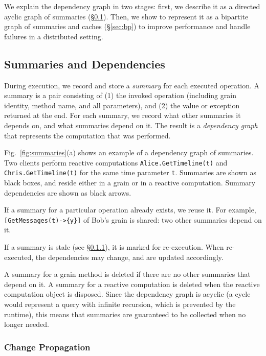 We explain the dependency graph in two stages: first, we describe it as a directed ayclic graph of summaries (\S\ref{sec:summaries}). Then, we show to represent it as a bipartite graph of summaries and caches (\S\ref{sec:bp}) to improve performance and handle failures in a distributed setting. 

\subsection{Summaries and Dependencies}\label{sec:summaries}

During execution, we record and store a \emph{summary} for each executed operation. A summary is a pair consisting of (1) the invoked operation (including grain identity, method name, and all parameters), and (2) the value or exception returned at the end. For each summary, we record what other summaries it depends on, and what summaries depend on it. The result is a \emph{dependency graph} that represents the computation that was performed.

Fig.~\ref{fig:summaries}(a) shows an example of a dependency graph of summaries. Two clients perform reactive computations \lstinline|Alice.GetTimeline(t)| and \lstinline|Chris.GetTimeline(t)| for the same time parameter \lstinline|t|. Summaries are shown as black boxes, and reside either in a grain or in a reactive computation. Summary dependencies are shown as black arrows.

 If a summary for a particular operation already exists, we reuse it. For example, \lstinline|[GetMessages(t)->{y}]| of Bob's grain is shared: two other summaries depend on it. 

 If a summary is stale (see \S\ref{sec:cp}), it is marked for re-execution. When re-executed, the dependencies may change, and are updated accordingly. 

 A summary for a grain method is deleted if there are no other summaries that depend on it.  A summary for a reactive computation is deleted when the reactive computation object is disposed. Since the dependency graph is acyclic (a cycle would represent a query with infinite recursion, which is prevented by the runtime), this means that summaries are guaranteed to be collected when no longer needed.  

\subsubsection{Change Propagation}\label{sec:cp}


